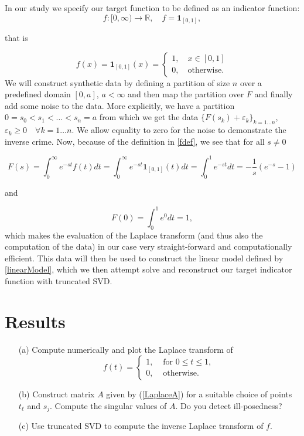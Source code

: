 \documentclass[12pt,a4]{article}
\newcommand{\R}{{\mathbb R}}
\newcommand{\lra}{\longrightarrow}
\newcommand{\ind}{{\mathbf{1}}}
\begin{document}
In our study we specify our target function to be defined as an indicator function:
\begin{equation}\label{fdef}
f:[0,\infty) \lra \R, \quad f = \ind_{[0,1]},
\end{equation}

that is

\begin{equation*}
f(x) = \ind_{[0,1]}(x)=
\begin{cases}
    1, \quad x \in [0,1]\\
    0, \quad \text{otherwise}.
\end{cases}
\end{equation*}
We will construct synthetic data by defining a partition of size $n$ over a predefined domain $[0,a]$, $a < \infty$ and then map the partition over $F$ and finally add some noise to the data. More explicitly, we have a partition $0=s_0 < s_1 < \ldots <s_n = a$ from which we get the data 
$\{F(s_k) + \varepsilon_k\}_{k = 1\ldots n}$, $\varepsilon_k \geq 0 \quad \forall k=1 \ldots n$. We allow equality to zero for the noise to demonstrate the inverse crime. Now, because of the definition in \eqref{fdef}, we see that for all $s \neq 0$  

\begin{equation*}
F(s) = \int_0^\infty e^{-st}f(t)dt 
     = \int_0^\infty e^{-st}\ind_{[0,1]}(t)dt
     = \int_0^1 e^{-st}dt
     = -\frac{1}{s}\left(e^{-s} - 1\right)
\end{equation*}

and

\begin{equation*}
F(0) = \int_0^1 e^{0}dt = 1,
\end{equation*}
which makes the evaluation of the Laplace transform (and thus also the computation of the data) in our case very straight-forward and computationally efficient. This data will then be used to construct the linear model defined by \eqref{linearModel}, which we then attempt solve and reconstruct our target indicator function with truncated SVD.

\section{Results}\label{sec:results}


\begin{itemize}
\item[(a)] Compute numerically and plot the Laplace transform of 
$$
  f(t) = \left\{\begin{array}{ll}1,&\mbox{ for }0\leq t \leq 1,\\0, &\mbox{ otherwise.}\end{array}\right.
$$

\item[(b)] Construct matrix $A$ given by (\ref{LaplaceA}) for a suitable choice of points $t_\ell$ and $s_j$. Compute the singular values of $A$. Do you detect ill-posedness?

\item[(c)] Use truncated SVD to compute the inverse Laplace transform of $f$.
\end{itemize}
\end{document}
